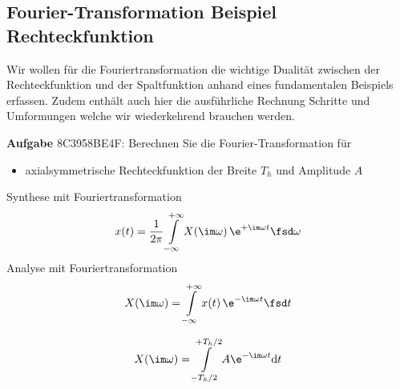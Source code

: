 \clearpage
\subsection{Fourier-Transformation Beispiel Rechteckfunktion}
\label{sec:8C3958BE4F}
\begin{Ziel}
Wir wollen für die Fouriertransformation die wichtige Dualität zwischen der
Rechteckfunktion und der Spaltfunktion anhand eines fundamentalen Beispiels erfassen.
Zudem enthält auch hier die ausführliche Rechnung Schritte und Umformungen
welche wir wiederkehrend brauchen werden.
\end{Ziel}
\textbf{Aufgabe} {\tiny 8C3958BE4F}: Berechnen Sie die Fourier-Transformation für
\begin{itemize}
\item axialsymmetrische Rechteckfunktion der Breite $T_h$ und Amplitude $A$
\end{itemize}

\begin{figure}[h!]
\centering
{}
\end{figure}

\begin{Werkzeug}
Synthese mit Fouriertransformation
\begin{align}
x(t) = \frac{1}{2\pi} \int\limits_{-\infty}^{+\infty} X(\im\omega) \, \e^{+\im \omega t} \fsd \omega
\end{align}
%
Analyse mit Fouriertransformation
\begin{align}
X(\im \omega) = \int\limits_{-\infty}^{+\infty} x(t) \, \e^{-\im \omega t} \fsd t
\end{align}
\end{Werkzeug}

\begin{Ansatz}
\begin{equation}
X(\im \omega) = \int\limits_{-T_h/2}^{+T_h/2} A \e^{-\im \omega t} \mathrm{d}t
\end{equation}
\end{Ansatz}

